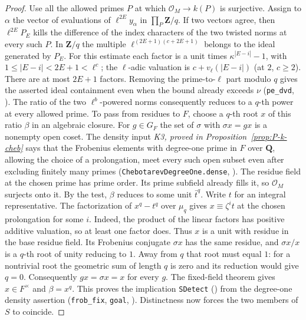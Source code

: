 \begin{proof}
Use all the allowed primes $P$ at which $\mathcal O_M\to k(P)$ is
surjective. Assign to $\alpha$ the vector of evaluations of
$\ell^{2E}y_\alpha$ in $\prod_P\mathbf Z/q$. If two vectors agree, then
$\ell^{2E}P_E$ kills the difference of the index characters of the two
twisted norms at every such $P$. In $\mathbf Z/q$ the multiple
$\ell^{(2E+1)(c+2E+1)}$ belongs to the ideal generated by $P_E$.
For this estimate each factor is a unit times
$\kappa^{|E-i|}-1$, with $1\le |E-i|<2E+1<\ell^c$;
the $\ell$-adic valuation is $c+v_\ell(|E-i|)$ (at $2$, $c\ge2$).
There are at most $2E+1$ factors. Removing the prime-to-$\ell$ part
modulo $q$ gives the asserted ideal containment even when the bound
already exceeds $\nu$ (\nolinkurl{pe_dvd}, ).
The ratio of the two $\ell^b$-powered norms consequently reduces to a
$q$-th power at every allowed prime. To pass from residues to $F$, choose a $q$-th root $x$ of this ratio
$\beta$ in an algebraic closure. For $g\in G_F$ the set of $\sigma$ with
$\sigma x=gx$ is a nonempty open coset. The density input \emph{K3, proved in Proposition~\ref{prop:P-k-cheb}} says that the Frobenius elements with degree-one prime in $F$
over $\mathbf Q$, allowing the choice of a prolongation, meet every such
open subset even after excluding finitely many primes
(\nolinkurl{ChebotarevDegreeOne.dense}, ).
The residue field at the chosen prime has prime order. Its prime subfield
already fills it, so $\mathcal O_M$ surjects onto it. By the test, $\beta$
reduces to some unit $\bar t^q$. Write $t$ for an integral representative.
The factorization of $x^q-t^q$ over $\mu_q$ gives
$x\equiv\zeta^i t$ at the chosen prolongation for some $i$. Indeed,
the product of the linear factors has positive additive valuation, so
at least one factor does. Thus $x$ is a unit with residue in the base
residue field. Its Frobenius conjugate $\sigma x$ has the same residue,
and $\sigma x/x$ is a $q$-th root of unity reducing to $1$. Away from
$q$ that root must equal $1$: for a nontrivial root the geometric sum
of length $q$ is zero and its reduction would give $q=0$.
Consequently $gx=\sigma x=x$ for every $g$. The fixed-field theorem gives
$x\in F^\times$ and $\beta=x^q$. This proves the implication
\nolinkurl{SDetect} () from the
degree-one density assertion (\nolinkurl{frob_fix}, \nolinkurl{goal},
). Distinctness now forces the two
members of $S$ to coincide.


\end{proof}
